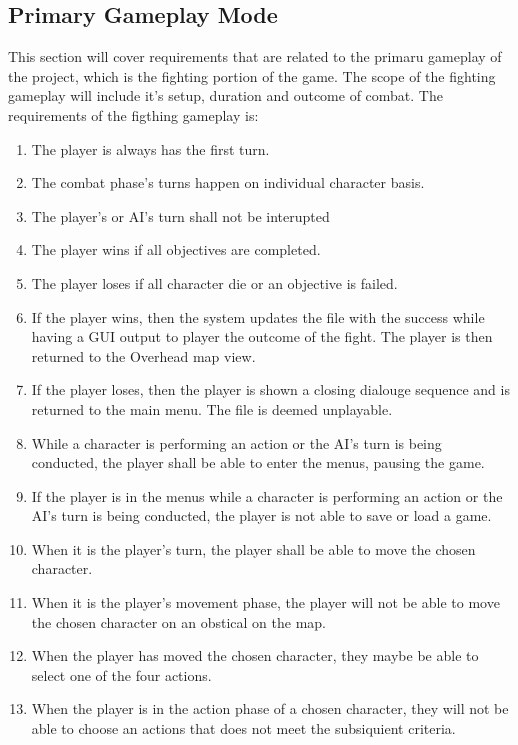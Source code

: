 \documentclass{article}
\begin{document}
\subsection{Primary Gameplay Mode}
\quad This section will cover requirements that are related to the primaru gameplay of the project, which is the fighting portion of the game. The scope of the fighting gameplay will include it's setup, duration and outcome of combat. The requirements of the figthing gameplay is:
\begin{enumerate}[{PGR}1. ]
	\item The player is always has the first turn.
	\item The combat phase's turns happen on individual character basis.
	\item The player's or AI's turn shall not be interupted
	\item The player wins if all objectives are completed.
	\item The player loses if all character die or an objective is failed.
	\item If the player wins, then the system updates the file with the success while having a GUI output to player the outcome of the fight. The player is then returned to the Overhead map view.
	\item If the player loses, then the player is shown a closing dialouge sequence and is returned to the main menu. The file is deemed unplayable.
	\item While a character is performing an action or the AI's turn is being conducted, the player shall be able to enter the menus, pausing the game.
	\item If the player is in the menus while a character is performing an action or the AI's turn is being conducted, the player is not able to save or load a game.
	\item When it is the player's turn, the player shall be able to move the chosen character.
	\item When it is the player's movement phase, the player will not be able to move the chosen character on an obstical on the map.
	\item When the player has moved the chosen character, they maybe be able to select one of the four actions.
	\item When the player is in the action phase of a chosen character, they will not be able to choose an actions that does not meet the subsiquient criteria.

\end{enumerate}
\end{document}
